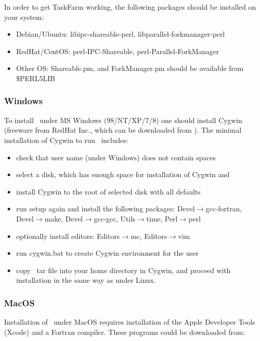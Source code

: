 In order to get TaskFarm working, the following packages should be installed
on your system:

\begin{itemize}
\item Debian/Ubuntu: libipc-shareable-perl, libparallel-forkmanager-perl
\item RedHat/CentOS: perl-IPC-Shareable, perl-Parallel-ForkManager
\item Other OS: Shareable.pm, and ForkManager.pm should be available from
                \$PERL5LIB
\end{itemize}

\subsubsection{Windows}

To install \molcas\ under MS Windows (98/NT/XP/7/8) one should install Cygwin
(freeware from RedHat Inc., which can be downloaded from \CygwinWWW).
The minimal installation of Cygwin to run \molcas\ includes:
\begin{itemize}
\item check that user name (under Windows) does not contain spaces
\item select a disk, which has enough space for installation of Cygwin and \molcas
\item install Cygwin to the root of selected disk with all defaults
\item run setup again and install the following packages: Devel$\rightarrow$gcc-fortran,
Devel$\rightarrow$make, Devel$\rightarrow$gcc-gcc, Utils$\rightarrow$time, Perl$\rightarrow$perl
\item optionally install editors: Editors$\rightarrow$mc, Editors$\rightarrow$vim
\item run cygwin.bat to create Cygwin environment for the user
\item copy \molcas\ tar file into your home directory in Cygwin, and
proceed with installation in the same way as under Linux.
\end{itemize}

\subsubsection{MacOS}

Installation of \molcas\ under MacOS requires installation of the Apple
Developer Tools (Xcode) and a Fortran compiler. These programs could be
downloaded from:

